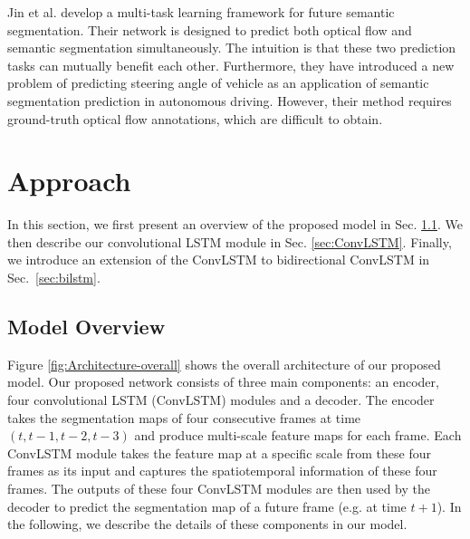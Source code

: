 \documentclass{bmvc2k}
\begin{document}
Jin et al.\cite{jin2017predicting} develop a multi-task learning framework for future semantic segmentation. Their network is designed to predict both optical flow and semantic segmentation simultaneously. The intuition is that these two prediction tasks can mutually benefit each other. Furthermore, they have introduced a new problem of predicting steering angle of vehicle as an application of semantic segmentation prediction in autonomous driving. However, their method requires ground-truth optical flow annotations, which are difficult to obtain.

\section{Approach}\label{sec:approach}
In this section, we first present an overview of the proposed model in Sec. \ref{sec:overview}. We then describe our convolutional LSTM module in Sec. \ref{sec:ConvLSTM}. Finally, we introduce an extension of the ConvLSTM to bidirectional ConvLSTM in Sec.~\ref{sec:bilstm}.

\subsection{Model Overview}\label{sec:overview}
Figure \ref{fig:Architecture-overall} shows the overall architecture of our proposed model. Our proposed network consists of three main components: an encoder, four convolutional LSTM (ConvLSTM) modules and a decoder. The encoder takes the segmentation maps of four consecutive frames at time $(t, t-1, t-2, t-3)$ and produce multi-scale feature maps for each frame. Each ConvLSTM module takes the feature map at a specific scale from these four frames as its input and captures the spatiotemporal information of these four frames. The outputs of these four ConvLSTM modules are then used by the decoder to predict the segmentation map of a future frame (e.g. at time $t+1$). In the following, we describe the details of these components in our model.
\end{document}
